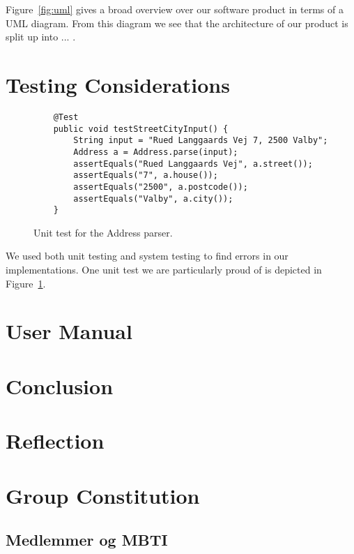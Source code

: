\documentclass[11pt]{article}
\begin{document}
Figure~\ref{fig:uml} gives a broad overview over our software product in terms of a UML diagram. From this diagram we see that the architecture of our product is split up into ... .

\section{Testing Considerations}\label{sec:testing}

\begin{figure}[t!]
    \begin{lstlisting}
    @Test
    public void testStreetCityInput() {
        String input = "Rued Langgaards Vej 7, 2500 Valby";
        Address a = Address.parse(input);
        assertEquals("Rued Langgaards Vej", a.street());
        assertEquals("7", a.house());
        assertEquals("2500", a.postcode());
        assertEquals("Valby", a.city());
    }
    \end{lstlisting}
    \caption{Unit test for the Address parser.}
    \label{fig:unittest}
\end{figure}

We used both unit testing and system testing to find errors in our implementations. One unit test we are particularly proud of is depicted in Figure~\ref{fig:unittest}.

\section{User Manual}\label{sec:manual}

\section{Conclusion}\label{sec:conclusion}

\section{Reflection}\label{sec:reflection}

\appendix

\section{Group Constitution}

\subsection{Medlemmer og MBTI}
\end{document}
